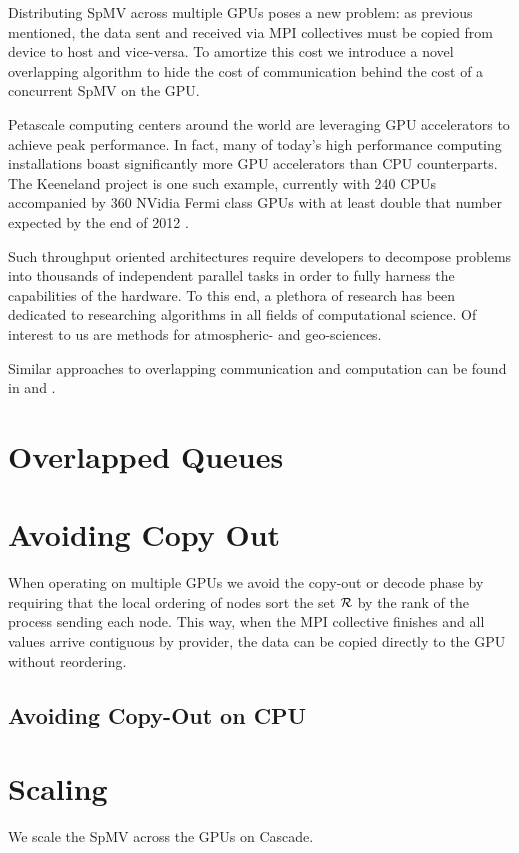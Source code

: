 \documentclass{report}
\begin{document}
Distributing SpMV across multiple GPUs poses a new problem: as previous mentioned, the data sent and received via MPI collectives must be copied from device to host and vice-versa. To amortize this cost we introduce a novel overlapping algorithm to hide the cost of communication behind the cost of a concurrent SpMV on the GPU. 


Petascale computing centers around the world are leveraging GPU accelerators to achieve peak performance. In fact, many of today's high performance computing installations boast significantly more GPU accelerators than CPU counterparts. The Keeneland project is one such example, currently with 240 CPUs accompanied by 360 NVidia Fermi class GPUs with at least double that number expected by the end of 2012 \cite{Vetter2011}. 

Such throughput oriented architectures require developers to decompose problems into thousands of independent parallel tasks in order to fully harness the capabilities of the hardware. To this end, a plethora of research has been dedicated to researching algorithms in all fields of computational science. Of interest to us are methods for atmospheric- and geo-sciences. 


Similar approaches to overlapping communication and computation can be found in \cite{Schubert2011} and \cite{Thibault2009}.

\section{Overlapped Queues}

\section{Avoiding Copy Out}
When operating on multiple GPUs we avoid the copy-out or decode phase by requiring that the local ordering of nodes sort the set $\mathcal{R}$ by the rank of the process sending each node. This way, when the MPI collective finishes and all values arrive contiguous by provider, the data can be copied directly to the GPU without reordering.




\subsection{Avoiding Copy-Out on CPU}

\section{Scaling}
We scale the SpMV across the GPUs on Cascade.
\end{document}
